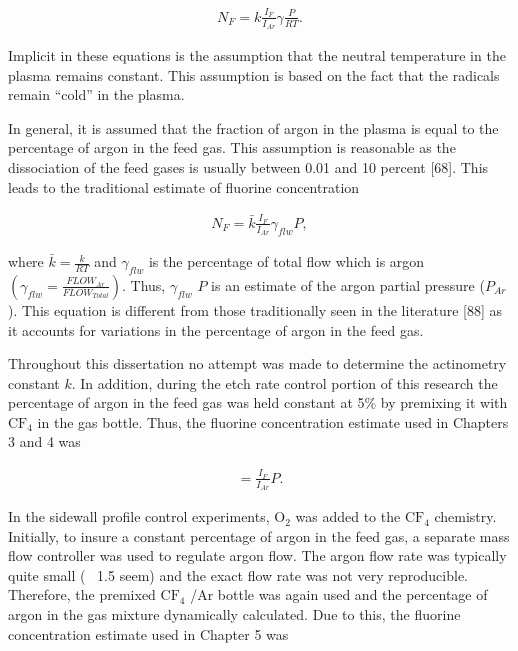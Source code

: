 \begin{align}
	N_{F} = k\frac{I_{F}}{I_{Ar}}\gamma \frac{P}{RT}.
\end{align}


\noindent Implicit in these equations is the assumption that the neutral temperature in the plasma remains constant. This assumption is based on the fact that the radicals remain “cold” in the plasma.

In general, it is assumed that the fraction of argon in the plasma is equal to the percentage of argon in the feed gas. This assumption is reasonable as the dissociation of the feed
gases is usually between 0.01 and 10 percent [68]. This leads to the traditional estimate of
fluorine concentration

\begin{align}
	N_{F} = \bar{k} \frac{I_{F}}{I_{Ar}}\gamma_{flw} P,
\end{align}

\noindent where $\bar{k} =\frac{k}{RT}$ and $\gamma_{flw}$ is the percentage of total flow which is argon $\left( \gamma_{flw} = \frac{FLOW_{Ar}}{FLOW_{Total}} \right)$. Thus, $\gamma_{flw}$ $P$ is an estimate of the argon partial pressure ($P_{Ar}$). This equation is different from those traditionally seen in the literature [88] as it accounts for variations in the percentage of argon in the feed gas.

Throughout this dissertation no attempt was made to determine the actinometry constant $k$. In addition, during the etch rate control portion of this research the percentage of
argon in the feed gas was held constant at 5\% by premixing it with $\text{CF}_{4}$ in the gas bottle. Thus, the fluorine concentration estimate used in Chapters 3 and 4 was


\begin{align}
	[F]= \frac{I_{F}}{I_{Ar}}P.
\end{align}


In the sidewall profile control experiments, $\text{O}_{2}$ was added to the $\text{CF}_{4}$ chemistry. Initially, to insure a constant percentage of argon in the feed gas, a separate mass flow controller was used to regulate argon flow. The argon flow rate was typically quite small (~ 1.5 seem) and the exact flow rate was not very reproducible. Therefore, the premixed $\text{CF}_{4}$ /Ar bottle was again used and the percentage of argon in the gas mixture dynamically calculated. Due to this, the fluorine concentration estimate used in Chapter 5 was


